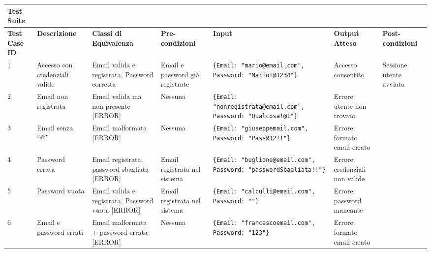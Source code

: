 \begin{tabular}{|p{2cm}|p{2cm}|p{2cm}|p{2cm}|p{5cm}|p{2cm}|p{2cm}|}
\hline
\rowcolor{SkyBlue}
\textbf{Test Suite} & & & & & &\\
\hline
\rowcolor{Red}
\textbf{Test Case ID} & \textbf{Descrizione} & \textbf{Classi di Equivalenza} & \textbf{Pre-condizioni} & \textbf{Input} & \textbf{Output Atteso} & \textbf{Post-condizioni} \\
\hline
1 & Accesso con credenziali valide & Email valida e registrata, Password corretta & Email e password già registrate & \texttt{\{Email: "mario@email.com", Password: "Mario!@1234"\}} & Accesso consentito & Sessione utente avviata \\
\hline
2 & Email non registrata & Email valida ma non presente [ERROR] & Nessuna & \texttt{\{Email: "nonregistrata@email.com", Password: "Qualcosa!@1"\}} & Errore: utente non trovato & \\
\hline
3 & Email senza “@” & Email malformata [ERROR] & Nessuna & \texttt{\{Email: "giuseppemail.com", Password: "Pass@12!!"\}} & Errore: formato email errato & \\
\hline
4 & Password errata & Email registrata, password sbagliata [ERROR] & Email registrata nel sistema & \texttt{\{Email: "buglione@email.com", Password: "passwordSbagliata!!"\}} & Errore: credenziali non valide & \\
\hline
5 & Password vuota & Email valida e registrata, Password vuota [ERROR] & Email registrata nel sistema & \texttt{\{Email: "calculli@email.com", Password: ""\}} & Errore: password mancante & \\
\hline
6 & Email e password errati & Email malformata + password errata [ERROR] & Nessuna & \texttt{\{Email: "francescoemail.com", Password: "123"\}} & Errore: formato email errato & \\
\hline
\end{tabular}

